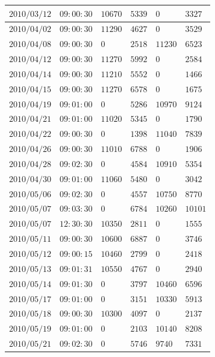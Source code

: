 \documentclass[a4j,papersize,disablejfam,slide,14pt]{jsarticle}
\begin{document}
\begin{description}
\begin{center}
\begin{longtable}{|l|l|l|l|l|l|}
					$2010/03/12$ & $09:00:30$  & $10670$ & $5339$ & $0$ & $3327$ \\ \hline
					$2010/04/02$ & $09:00:30$  & $11290$ & $4627$ & $0$ & $3529$ \\ \hline
					$2010/04/08$ & $09:00:30$  & $0$ & $2518$ & $11230$ & $6523$ \\ \hline
					$2010/04/12$ & $09:00:30$  & $11270$ & $5992$ & $0$ & $2584$ \\ \hline
					$2010/04/14$ & $09:00:30$  & $11210$ & $5552$ & $0$ & $1466$ \\ \hline
					$2010/04/15$ & $09:00:30$  & $11270$ & $6578$ & $0$ & $1675$ \\ \hline
					$2010/04/19$ & $09:01:00$  & $0$ & $5286$ & $10970$ & $9124$ \\ \hline
					$2010/04/21$ & $09:01:00$  & $11020$ & $5345$ & $0$ & $1790$ \\ \hline
					$2010/04/22$ & $09:00:30$  & $0$ & $1398$ & $11040$ & $7839$ \\ \hline
					$2010/04/26$ & $09:00:30$  & $11010$ & $6788$ & $0$ & $1906$ \\ \hline
					$2010/04/28$ & $09:02:30$  & $0$ & $4584$ & $10910$ & $5354$ \\ \hline
					$2010/04/30$ & $09:01:00$  & $11060$ & $5480$ & $0$ & $3042$ \\ \hline
					$2010/05/06$ & $09:02:30$  & $0$ & $4557$ & $10750$ & $8770$ \\ \hline
					$2010/05/07$ & $09:03:30$  & $0$ & $6784$ & $10260$ & $10101$ \\ \hline
					$2010/05/07$ & $12:30:30$  & $10350$ & $2811$ & $0$ & $1555$ \\ \hline
					$2010/05/11$ & $09:00:30$  & $10600$ & $6887$ & $0$ & $3746$ \\ \hline
					$2010/05/12$ & $09:00:15$  & $10460$ & $2799$ & $0$ & $2418$ \\ \hline
					$2010/05/13$ & $09:01:31$  & $10550$ & $4767$ & $0$ & $2940$ \\ \hline
					$2010/05/14$ & $09:01:30$  & $0$ & $3797$ & $10460$ & $6596$ \\ \hline
					$2010/05/17$ & $09:01:00$  & $0$ & $3151$ & $10330$ & $5913$ \\ \hline
					$2010/05/18$ & $09:00:30$  & $10300$ & $4097$ & $0$ & $2137$ \\ \hline
					$2010/05/19$ & $09:01:00$  & $0$ & $2103$ & $10140$ & $8208$ \\ \hline
					$2010/05/21$ & $09:02:30$  & $0$ & $5746$ & $9740$ & $7331$ \\ \hline

\end{longtable}
\end{center}
\end{description}
\end{document}
